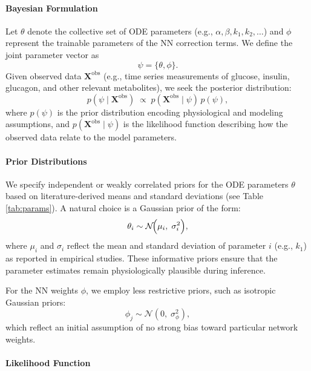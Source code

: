\documentclass[9pt,shortpaper,twoside,web]{ieeecolor}
\begin{document}
\paragraph{Bayesian Formulation}

Let \(\theta\) denote the collective set of ODE parameters (e.g., \(\alpha, \beta, k_1, k_2,\ldots\)) and \(\phi\) represent the trainable parameters of the NN correction terms. We define the joint parameter vector as 
\[
\psi = \{\theta, \phi\}.
\]
Given observed data \(\bm{X}^{\text{obs}}\) (e.g., time series measurements of glucose, insulin, glucagon, and other relevant metabolites), we seek the posterior distribution:
\begin{equation}
p(\psi \mid \bm{X}^{\text{obs}}) \; \propto \; p(\bm{X}^{\text{obs}} \mid \psi) \, p(\psi),
\label{eq:posterior}
\end{equation}
where \(p(\psi)\) is the prior distribution encoding physiological and modeling assumptions, and \(p(\bm{X}^{\text{obs}} \mid \psi)\) is the likelihood function describing how the observed data relate to the model parameters.

\paragraph{Prior Distributions}

We specify independent or weakly correlated priors for the ODE parameters \(\theta\) based on literature-derived means and standard deviations (see Table \ref{tab:params}). A natural choice is a Gaussian prior of the form:
\[
\theta_i \sim \mathcal{N}\!\Bigl(\mu_i,\;\sigma_i^2\Bigr),
\]
where \(\mu_i\) and \(\sigma_i\) reflect the mean and standard deviation of parameter \(i\) (e.g., \(k_1\)) as reported in empirical studies. These informative priors ensure that the parameter estimates remain physiologically plausible during inference.

For the NN weights \(\phi\), we employ less restrictive priors, such as isotropic Gaussian priors:
\[
\phi_j \sim \mathcal{N}(0,\;\sigma_{\phi}^2),
\]
which reflect an initial assumption of no strong bias toward particular network weights.

\paragraph{Likelihood Function}
\end{document}
